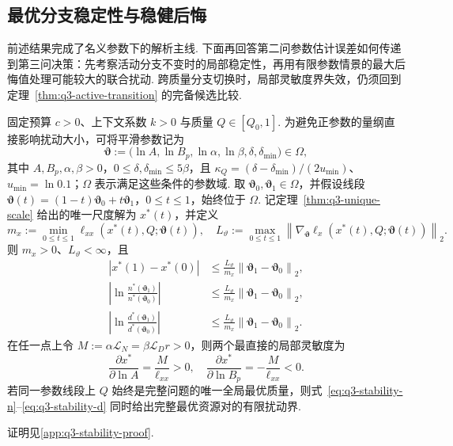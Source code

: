 \subsection{最优分支稳定性与稳健后悔}

前述结果完成了名义参数下的解析主线. 下面再回答第二问参数估计误差如何传递到第三问决策：先考察活动分支不变时的局部稳定性，再用有限参数情景的最大后悔值处理可能较大的联合扰动. 跨质量分支切换时，局部灵敏度界失效，仍须回到定理~\ref{thm:q3-active-transition} 的完备候选比较. 

\begin{proposition}[固定质量最优分支的参数稳定性]\label{prop:q3-parameter-stability}
固定预算 $c>0$、上下文系数 $k>0$ 与质量 $Q\in[Q_0,1]$. 为避免正参数的量纲直接影响扰动大小，可将平滑参数记为
\begin{equation}\label{eq:q3-stability-parameterization}
\boldsymbol\vartheta
:=\bigl(\ln A,\ln B_p,\ln\alpha,\ln\beta,\delta,\delta_{\min}\bigr)\in\Omega,
\end{equation}
其中 $A,B_p,\alpha,\beta>0$，$0\le\delta,\delta_{\min}\le5\beta$，且
$\kappa_Q=(\delta-\delta_{\min})/(2u_{\min})$、$u_{\min}=\ln0.1$；$\Omega$ 表示满足这些条件的参数域. 取 $\boldsymbol\vartheta_0,\boldsymbol\vartheta_1\in\Omega$，并假设线段
$\boldsymbol\vartheta(t)=(1-t)\boldsymbol\vartheta_0+t\boldsymbol\vartheta_1$，$0\le t\le1$，始终位于 $\Omega$. 记定理~\ref{thm:q3-unique-scale} 给出的唯一尺度解为 $x^*(t)$，并定义
\begin{equation}\label{eq:q3-stability-constants}
m_x:=\min_{0\le t\le1}\ell_{xx}(x^*(t),Q;\boldsymbol\vartheta(t)),\quad
L_{\vartheta}:=\max_{0\le t\le1}
\left\|\nabla_{\boldsymbol\vartheta}\ell_x(x^*(t),Q;\boldsymbol\vartheta(t))\right\|_2.
\end{equation}
则 $m_x>0$、$L_{\vartheta}<\infty$，且
\begin{subequations}
\begin{align}
\left|x^*(1)-x^*(0)\right|
&\le \frac{L_{\vartheta}}{m_x}
\left\|\boldsymbol\vartheta_1-\boldsymbol\vartheta_0\right\|_2,\label{eq:q3-stability-x}\\
\left|\ln\frac{n^*(\boldsymbol\vartheta_1)}{n^*(\boldsymbol\vartheta_0)}\right|
&\le \frac{L_{\vartheta}}{m_x}
\left\|\boldsymbol\vartheta_1-\boldsymbol\vartheta_0\right\|_2,\label{eq:q3-stability-n}\\
\left|\ln\frac{d^*(\boldsymbol\vartheta_1)}{d^*(\boldsymbol\vartheta_0)}\right|
&\le \frac{L_{\vartheta}}{m_x}
\left\|\boldsymbol\vartheta_1-\boldsymbol\vartheta_0\right\|_2.\label{eq:q3-stability-d}
\end{align}
\end{subequations}
在任一点上令 $M:=\alpha\mathcal L_N=\beta\mathcal L_Dr>0$，则两个最直接的局部灵敏度为
\begin{equation}\label{eq:q3-stability-AB}
\frac{\partial x^*}{\partial\ln A}=\frac{M}{\ell_{xx}}>0,
\quad
\frac{\partial x^*}{\partial\ln B_p}=-\frac{M}{\ell_{xx}}<0.
\end{equation}
若同一参数线段上 $Q$ 始终是完整问题的唯一全局最优质量，则式~\eqref{eq:q3-stability-n}--\eqref{eq:q3-stability-d} 同时给出完整最优资源对的有限扰动界. %
\end{proposition}
证明见\ref{app:q3-stability-proof}. 

